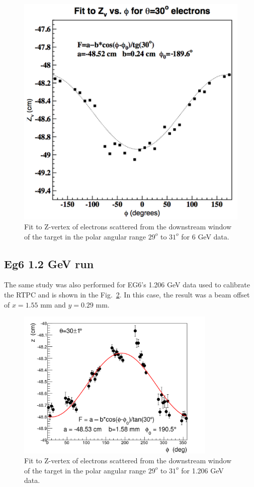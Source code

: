 \documentclass[12pt]{article}
\begin{document}
\begin{figure}[htb]
\begin{center}
\includegraphics[width=.7\textwidth]{beam_xy_fix.png}
\caption{Fit to Z-vertex of electrons scattered from the downstream window of the target in the polar angular range $29^o$ to $31^o$ for 6 GeV data.}
\label{fig:ze2931}
\end{center}
\end{figure}

\clearpage

\subsection{Eg6 1.2 GeV run}

The same study was also performed for EG6's 1.206 GeV data used to calibrate the RTPC and is shown in the Fig.~\ref{fig:zphi1gev}.  In this case, the result was a beam offset of $x=1.55$ mm and $y=0.29$ mm.  

\begin{figure}[htb]
\begin{center}
\includegraphics[width=0.85\textwidth]{zphi_1gev_fix.png}
\caption{Fit to Z-vertex of electrons scattered from the downstream window of the target in the polar angular range $29^o$ to $31^o$ for 1.206 GeV data.
\label{fig:zphi1gev}}
\end{center}
\end{figure}
\end{document}
